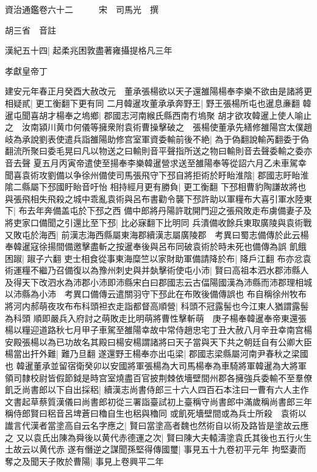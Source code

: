 資治通鑑卷六十二　　　宋　司馬光　撰

胡三省　音註

漢紀五十四|{
	起柔兆困敦盡著雍攝提格凡三年}


孝獻皇帝丁

建安元年春正月癸酉大赦改元　董承張楊欲以天子還雒陽楊奉李樂不欲由是諸將更相疑貳|{
	更工衡翻下更有同}
二月韓暹攻董承承奔野王|{
	野王張楊所屯也暹息亷翻}
韓暹屯聞喜胡才楊奉之塢鄉|{
	郡國志河南緱氏縣西南冇塢聚}
胡才欲攻韓暹上使人喻止之　汝南潁川黄巾何儀等擁衆附袁術曹操擊破之　張楊使董承先繕修雒陽宫太僕趙岐為承說劉表使遣兵詣雒陽助修宫室軍資委輸前後不絶|{
	為于偽翻說輸芮翻委于偽翻流所聚曰委毛晃曰凡以物送之曰輸則音平聲指所送之物曰輸則音去聲委輸之委亦音去聲}
夏五月丙寅帝遣使至揚奉李樂韓暹營求送至雒陽奉等從詔六月乙未車駕幸聞喜袁術攻劉備以争徐州備使司馬張飛守下邳自將拒術於盱眙淮陰|{
	郡國志盱眙淮隂二縣屬下邳國盱眙音吁怡}
相持經月更有勝負|{
	更工衡翻}
下邳相曹豹陶謙故將也與張飛相失飛殺之城中乖亂袁術與呂布書勸令襲下邳許助以軍糧布大喜引軍水陸東下|{
	布去年奔備盖屯於下邳之西}
備中郎將丹陽許耽開門迎之張飛敗走布虜備妻子及將吏家口備聞之引還比至下邳|{
	比必寐翻下比明同}
兵潰備收餘兵東取廣陵與袁術戰又敗屯於海西|{
	前漢志海西縣屬東海郡續漢志屬廣陵郡　考異曰蜀志備傳於此云楊奉韓暹寇徐揚間備邀擊盡斬之按暹奉後與呂布同破袁術於時未死也備傳為誤}
飢餓困踧|{
	踧子六翻}
吏士相食從事東海糜竺以家財助軍備請降於布|{
	降戶江翻}
布亦忿袁術運糧不繼乃召備復以為豫州刺史與并埶擊術使屯小沛|{
	賢曰高祖本泗水郡沛縣人及得天下改泗水為沛郡小沛即沛縣宋白曰郡國志云古偪陽國漢為沛縣而沛郡理相城以沛縣為小沛　考異口備傳云遣關羽守下邳此在布敗後備傳誤也}
布自稱徐州牧布將河内郝萌夜攻布布科頭袒衣走詣都督高順營|{
	科頭不冠露髻也今江東人猶謂露髻為科頭}
順即嚴兵入府討之萌敗走比明萌將曹性擊斬萌　庚子楊奉韓暹奉帝東還張楊以糧迎道路秋七月甲子車駕至雒陽幸故中常侍趙忠宅丁丑大赦八月辛丑幸南宫楊安殿張楊以為已功故名其殿曰楊安楊謂諸將曰天子當與天下共之朝廷自有公卿大臣楊當出扞外難|{
	難乃旦翻}
遂還野王楊奉亦出屯梁|{
	郡國志梁縣屬河南尹春秋之梁國也}
韓暹董承並留宿衛癸卯以安國將軍張楊為大司馬楊奉為車騎將軍韓暹為大將軍領司隸校尉皆假節鉞是時宫室燒盡百官披荆棘依墻壁間州郡各擁強兵委輸不至羣僚飢乏尚書郎以下自出採稆|{
	續漢志尚書侍郎三十六人四百石本注曰一曹有六人主作文書起草蔡質漢儀曰尚書郎初從三署詣臺試初上臺稱守尚書郎中滿歲稱尚書郎三年稱侍郎賢曰稆音呂埤蒼曰穭自生也稆與穭同}
或飢死墻壁間或為兵士所殺　袁術以䜟言代漢者當塗高自云名字應之|{
	賢曰當塗高者魏也然術自以術及路皆是塗故云應之}
又以袁氏出陳為舜後以黄代赤德運之次|{
	賢曰陳大夫轅濤塗袁氏其後也五行火生土故云以黄代赤}
遂有僭逆之謀聞孫堅得傳國璽|{
	事見五十九卷初平元年}
拘堅妻而奪之及聞天子敗於曹陽|{
	事見上卷興平二年}
